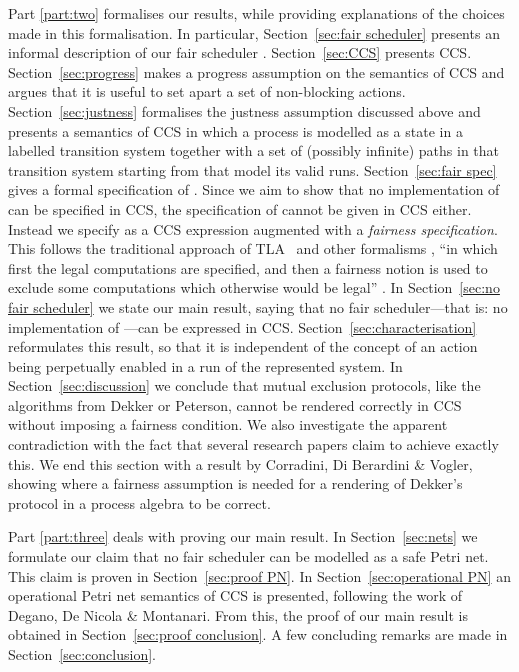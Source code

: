\documentclass[smallcondensed]{svjour3}
\makeatletter
\newcommand{\Part}[1]{Part {\ref{part:#1}}}
\newcommand{\Sect}[1]{Section~\ref{sec:#1}}
\newcommand{\mand}{\&\xspace}
\newcounter {part}
\renewcommand\thepart{\@Roman\c@part}
\def\part#1#2{\vspace{6ex}
\noindent {\Large\bf\boldmath Part \refstepcounter{part}\thepart\ \ \ #1\label{part:#2}}

\vspace{-3.5ex}
}
\makeatother
\begin{document}
\Part{two} formalises our results, while providing explanations of the choices made in this formalisation.
In particular, \Sect{fair scheduler} presents an informal description of our fair
scheduler .  \Sect{CCS} presents CCS\@.
\Sect{progress} makes a 
progress assumption on the semantics of CCS and argues that it is
useful to set apart a set of non-blocking actions.
\Sect{justness} formalises the justness assumption discussed above and presents a semantics of CCS in which a process
 is modelled as a state in a labelled transition system together with a set of (possibly
infinite) paths in that transition system starting from  that model its valid runs.
 \Sect{fair spec} gives a formal specification of .
Since we aim to show that no implementation of  can be
specified in CCS, the specification of  cannot be given in CCS
either.  Instead we specify  as a CCS expression augmented
with a \emph{fairness specification}.  This follows the traditional
approach of TLA~\cite{TLA} and other formalisms \cite{Fr86}, ``in which
first the legal computations are specified, and then a fairness notion
is used to exclude some computations which otherwise would be legal'' \cite{AFK88}.
In \Sect{no fair scheduler} we state our main result, saying that no fair scheduler---that is: no
implementation of ---can be expressed in CCS\@.
\Sect{characterisation} reformulates this result, so that it is
independent of the concept of an action being perpetually enabled in a run of the represented system.
In \Sect{discussion} we conclude that mutual exclusion
protocols, like the algorithms from Dekker or Peterson, cannot be
rendered correctly in CCS without imposing a fairness condition.
We also investigate the apparent contradiction with the fact that
several research papers claim to achieve exactly this.
We end this section with a result by Corradini, Di Berardini \mand Vogler,
showing where a fairness assumption is needed for a rendering
of Dekker's protocol in a process algebra to be correct.

\Part{three} deals with proving our main result.
In \Sect{nets} we formulate our claim that no fair scheduler can be modelled as a 
safe Petri net. This claim is proven in \Sect{proof PN}.
In \Sect{operational PN} an operational Petri net semantics of CCS is
presented, following the work of Degano, De Nicola \mand Montanari.
From this, the proof of our main result is obtained in \Sect{proof conclusion}.
A few concluding remarks are made in \Sect{conclusion}.


\part{Formalisation}{two}
\end{document}
